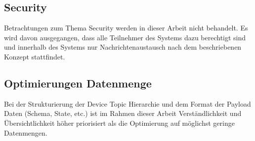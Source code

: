 \subsection{Security}
Betrachtungen zum Thema Security werden in dieser Arbeit nicht behandelt. Es wird davon ausgegangen, dass alle Teilnehmer des Systems dazu berechtigt sind und innerhalb des Systems nur Nachrichtenaustausch nach dem beschriebenen Konzept stattfindet.

\subsection{Optimierungen Datenmenge}
Bei der Strukturierung der Device Topic Hierarchie und dem Format der Payload Daten (Schema, State, etc.) ist im Rahmen dieser Arbeit Verständlichkeit und Übersichtlichkeit höher priorisiert als die Optimierung auf möglichst geringe Datenmengen.